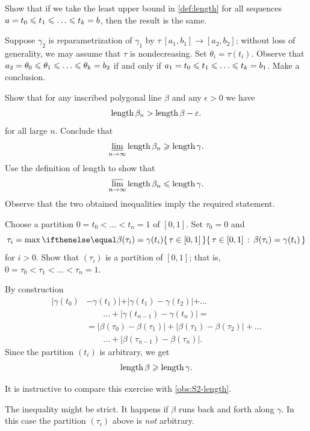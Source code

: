 
\setcounter{eqtn}{0}

Show that if we take the least upper bound in \ref{def:length} for all sequences
$a=t_0\le t_1\le\z\dots\le t_k=b$, then the result is the same.

Suppose $\gamma_2$ is reparametrization of $\gamma_1$ by $\tau\:[a_1,b_1]\to [a_2,b_2]$;
without loss of generality, we may assume that $\tau$ is nondecreasing.
Set $\theta_i=\tau(t_i)$.
Observe that $a_2=\theta_0\z\le\theta_1\le \z\dots\le\theta_k=b_2$ if and only if 
$a_1=t_0\le t_1\le\z\dots\le t_k=b_1$.
Make a conclusion.

Show that for any inscribed polygonal line $\beta$ and any $\epsilon>0$ we have
\[\mathop{\rm length}\nolimits\beta_n>\mathop{\rm length}\nolimits\beta-\varepsilon.\]
for all large $n$.
Conclude that
\[\varliminf_{n\to\infty}\mathop{\rm length}\nolimits\beta_n\geqslant \mathop{\rm length}\nolimits \gamma.\]
Use the definition of length to show that 
\[\varlimsup_{n\to\infty}\mathop{\rm length}\nolimits\beta_n\leqslant \mathop{\rm length}\nolimits \gamma.\]
Observe that the two obtained inequalities imply the required statement.

Choose a partition $0=t_0<\dots <t_n=1$ of $[0,1]$.
Set $\tau_0=0$ and 
\[\tau_i=\max\set{\tau \in[0,1]}{\beta(\tau_i)=\gamma(t_i)}\]
for $i>0$.
Show that $(\tau_i)$ is a partition of $[0,1]$;
that is, $0=\tau_0<\tau_1<\dots<\tau_n=1$.

By construction 
\begin{align*}
|\gamma(t_0)&-\gamma(t_1)|+|\gamma(t_1)-\gamma(t_2)|+\dots
\\
&\qquad\dots+|\gamma(t_{n-1})-\gamma(t_n)|=
\\
&=
|\beta(\tau_0)-\beta(\tau_1)|+|\beta(\tau_1)-\beta(\tau_2)|+\dots
\\
&\qquad\dots+|\beta(\tau_{n-1})-\beta(\tau_n)|.
\end{align*}
Since the partition $(t_i)$ is arbitrary, we get 
\[\mathop{\rm length}\nolimits \beta\geqslant \mathop{\rm length}\nolimits \gamma.\]

It is instructive to compare this exercise with \ref{obs:S2-length}.

The inequality might be strict.
It happens if $\beta$ runs back and forth along $\gamma$.
In this case the partition $(\tau_i)$ above is \textit{not} arbitrary.

